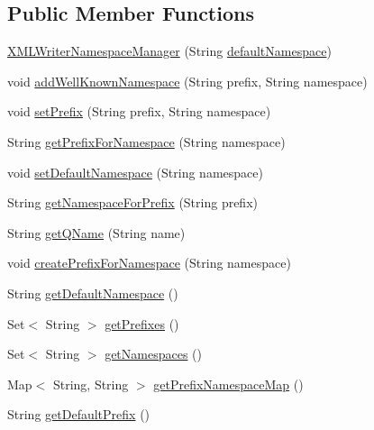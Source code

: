 \subsection*{Public Member Functions}
\begin{DoxyCompactItemize}
\item 
\hyperlink{classorg_1_1coode_1_1xml_1_1_x_m_l_writer_namespace_manager_ab5e0f228da5825cf527496657fb8598d}{X\-M\-L\-Writer\-Namespace\-Manager} (String \hyperlink{classorg_1_1coode_1_1xml_1_1_x_m_l_writer_namespace_manager_a25840a2b26dff4709e9406e09809c006}{default\-Namespace})
\item 
void \hyperlink{classorg_1_1coode_1_1xml_1_1_x_m_l_writer_namespace_manager_a9334edb298a313772d3538c0929d8b0f}{add\-Well\-Known\-Namespace} (String prefix, String namespace)
\item 
void \hyperlink{classorg_1_1coode_1_1xml_1_1_x_m_l_writer_namespace_manager_a8be4144f9d23484e8590b25c0f3523fd}{set\-Prefix} (String prefix, String namespace)
\item 
String \hyperlink{classorg_1_1coode_1_1xml_1_1_x_m_l_writer_namespace_manager_aeb72290106c0c465d35a595a68953d89}{get\-Prefix\-For\-Namespace} (String namespace)
\item 
void \hyperlink{classorg_1_1coode_1_1xml_1_1_x_m_l_writer_namespace_manager_a676c5a44d6b423f4796642dfd698ebb3}{set\-Default\-Namespace} (String namespace)
\item 
String \hyperlink{classorg_1_1coode_1_1xml_1_1_x_m_l_writer_namespace_manager_ad2dacccd3f64648bd8fbb5a3fb3c638b}{get\-Namespace\-For\-Prefix} (String prefix)
\item 
String \hyperlink{classorg_1_1coode_1_1xml_1_1_x_m_l_writer_namespace_manager_abbd6067bf53651befe1b5d1454bc4854}{get\-Q\-Name} (String name)
\item 
void \hyperlink{classorg_1_1coode_1_1xml_1_1_x_m_l_writer_namespace_manager_a14c5ec0a0a147bc43c4e49bdcf8f3e76}{create\-Prefix\-For\-Namespace} (String namespace)
\item 
String \hyperlink{classorg_1_1coode_1_1xml_1_1_x_m_l_writer_namespace_manager_adae9fc4370cbb4fae39b355f4b908c85}{get\-Default\-Namespace} ()
\item 
Set$<$ String $>$ \hyperlink{classorg_1_1coode_1_1xml_1_1_x_m_l_writer_namespace_manager_a51baeabee191a80f9c0a7b674fe70d26}{get\-Prefixes} ()
\item 
Set$<$ String $>$ \hyperlink{classorg_1_1coode_1_1xml_1_1_x_m_l_writer_namespace_manager_a293f43c730ff2e615323c76d69e5bb24}{get\-Namespaces} ()
\item 
Map$<$ String, String $>$ \hyperlink{classorg_1_1coode_1_1xml_1_1_x_m_l_writer_namespace_manager_ab9751322b567dc60707ee6e916b085be}{get\-Prefix\-Namespace\-Map} ()
\item 
String \hyperlink{classorg_1_1coode_1_1xml_1_1_x_m_l_writer_namespace_manager_a825e80aae44062ee91041c6965ffb714}{get\-Default\-Prefix} ()
\end{DoxyCompactItemize}
